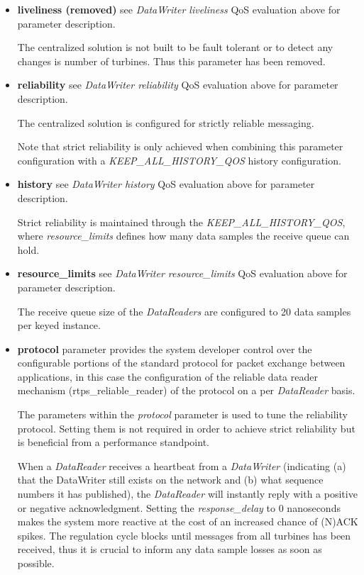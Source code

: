 \begin{itemize}
	\item \textbf{liveliness (removed)} see \textit{DataWriter liveliness} QoS evaluation above for parameter description. 
	
	The centralized solution is not built to be fault tolerant or to detect any changes is number of turbines. Thus this parameter has been removed.
	
	\item \textbf{reliability} see \textit{DataWriter reliability} QoS evaluation above for parameter description.
	
	The centralized solution is configured for strictly reliable messaging.
	
	Note that strict reliability is only achieved when combining this parameter configuration with a \textit{KEEP\_ALL\_HISTORY\_QOS} history configuration.
	\item \textbf{history} see \textit{DataWriter history} QoS evaluation above for parameter description.
	
	Strict reliability is maintained through the \textit{KEEP\_ALL\_HISTORY\_QOS}, where \textit{resource\_limits} defines how many data samples the receive queue can hold.
	
	\item \textbf{resource\_limits} see \textit{DataWriter resource\_limits} QoS evaluation above for parameter description.
	
	The receive queue size of the \textit{DataReaders} are configured to 20 data samples per keyed instance. 
	\item \textbf{protocol} parameter provides the system developer control over the configurable portions of the standard protocol for packet exchange between applications, in this case the configuration of the reliable data reader mechanism (rtps\_reliable\_reader) of the protocol on a per \textit{DataReader} basis.
	
	The parameters within the \textit{protocol} parameter is used to tune the reliability protocol. Setting them is not required in order to achieve strict reliability but is beneficial from a performance standpoint. 
	
	When a \textit{DataReader} receives a heartbeat from a \textit{DataWriter} (indicating (a) that the DataWriter still exists on the network and (b) what sequence numbers it has published), the \textit{DataReader} will instantly reply with a positive or negative acknowledgment. Setting the \textit{response\_delay} to 0 nanoseconds makes the system more reactive at the cost of an increased chance of (N)ACK spikes. The regulation cycle blocks until messages from all turbines has been received, thus it is crucial to inform any data sample losses as soon as possible.
\end{itemize}


